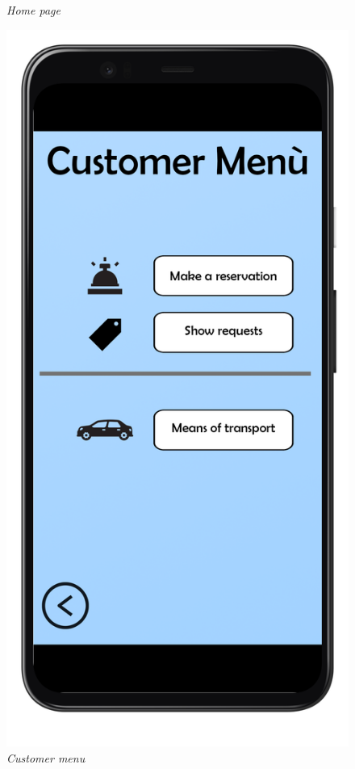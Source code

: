 \documentclass{article}
\begin{document}
\begin{figure}[!h]
\begin{minipage}[!h]{0.4\textwidth}
					\caption{\emph{Home page}}
				\end{minipage}
				\hfill
				\begin{minipage}[!h]{0.4\textwidth}
					\includegraphics[width=\textwidth]{../Mockups/MenuCustomer.png}
					\caption{\emph{Customer menu}}
				\end{minipage}

			\end{figure}
		
\end{document}
